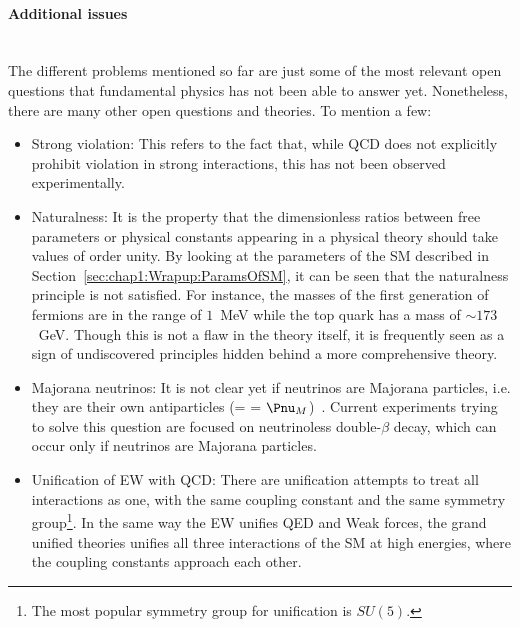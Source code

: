 \paragraph{Additional issues}\mbox{}\\ %
The different problems mentioned so far are just some of the most relevant open questions that fundamental 
physics has not been able to answer yet. %
Nonetheless, there are many other open questions and theories. To mention a few:
\begin{itemize}
	\item Strong \CP violation: This refers to the fact that, while QCD does not explicitly prohibit \CP 
		violation in strong interactions, this has not been observed experimentally.
	\item Naturalness:  It is the property that the dimensionless ratios between free parameters or physical constants 
		appearing in a physical theory should take values of order unity.  By looking at the parameters of the SM 
		described in Section~\ref{sec:chap1:Wrapup:ParamsOfSM}, it can be seen that the naturalness principle
		is not satisfied. For instance, the masses of the first generation of fermions are in the range of $1$~MeV 
		while the top quark has a mass of $\sim173$~GeV.
		Though this is not a flaw in the theory itself, it is frequently seen as a sign of undiscovered principles hidden 
		behind a more comprehensive theory.
	\item Majorana neutrinos: It is not clear yet if neutrinos are Majorana particles, i.e. they are their own 
		antiparticles (\Pnu = \APnu = $\Pnu_{M}$)~\cite{Majorana:1937vz}.
		Current experiments trying to solve this question are focused on neutrinoless double-$\beta$ decay,
		which can occur only if neutrinos are Majorana particles. 
	\item Unification of EW with QCD: There are unification attempts to treat all interactions as one, with the same coupling constant 
	and the same symmetry group\footnote{The most popular symmetry group for unification is $SU(5)$.}.
	In the same way the EW unifies QED and Weak forces, the grand unified theories unifies 
	all three interactions of the SM at high energies, where the coupling constants 
	approach each other. 
	

\end{itemize}
